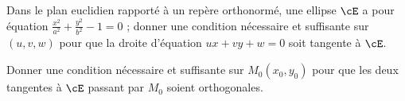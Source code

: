 \begin{enonce}
\begin{exercise}[ID={Bloc Vuibert4 191},subtitle={},tags={}, difficulty={0}]
Dans le plan euclidien rapporté à un repère orthonormé, une ellipse $\cE$ a pour équation
$\frac{x^2}{a^2}+\frac{y^2}{b^2}-1=0$ ; donner une condition nécessaire et suffisante sur $(u,v,w)$ pour que la droite d'équation $ux+vy+w=0$ soit tangente à $\cE$.

Donner une condition nécessaire et suffisante sur $M_0(x_0,y_0)$ pour que les deux tangentes à $\cE$ passant par $M_0$ soient orthogonales.
\end{exercise}
\end{enonce}
